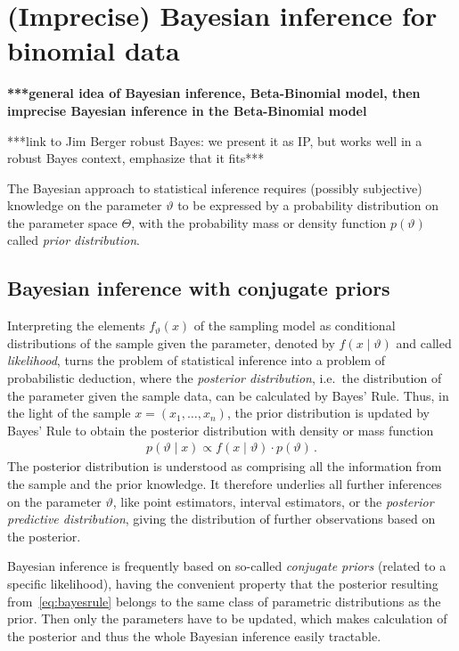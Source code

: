 \section{(Imprecise) Bayesian inference for binomial data}

\textbf{***general idea of Bayesian inference, Beta-Binomial model, then imprecise Bayesian inference in the Beta-Binomial model}

***link to Jim Berger robust Bayes: we present it as IP, but works well in a robust Bayes context, emphasize that it fits***

The Bayesian approach to statistical inference requires (possibly subjective) knowledge on the parameter $\vartheta$ to be expressed by a probability distribution on
the parameter space $\Theta$, with the probability mass or density function $p(\vartheta)$ called \emph{prior distribution}.


\subsection{Bayesian inference with conjugate priors}
\label{sec:regularconjugates}


Interpreting the elements $f_\vartheta(x)$ of the sampling model as conditional distributions of the sample given the parameter,
denoted by $f(x\mid\vartheta)$ and called \emph{likelihood},
turns the problem of statistical inference into a problem of probabilistic deduction,
where the \emph{posterior distribution}, i.e.\ the distribution of the parameter given the sample data,
can be calculated by Bayes' Rule.
Thus, in the light of the sample $x= (x_1, \ldots, x_n)$, the prior distribution is updated by Bayes' Rule
to obtain the posterior distribution with density or mass function
\begin{align}
\label{eq:bayesrule}
p(\vartheta\mid x) \propto f(x\mid\vartheta) \cdot p(\vartheta)\,.
\end{align}
The posterior distribution is understood as comprising all the information from the sample and the prior knowledge.
It therefore underlies all further inferences on the parameter $\vartheta$,
like point estimators, interval estimators,
or the \emph{posterior predictive distribution},
giving the distribution of further observations based on the posterior.

Bayesian inference is frequently based on so-called \emph{conjugate priors} (related to a specific likelihood),
having the convenient property that the posterior resulting from~\eqref{eq:bayesrule}
belongs to the same class of parametric distributions as the prior.
Then only the parameters have to be updated,
which makes calculation of the posterior and thus the whole Bayesian inference easily tractable.

